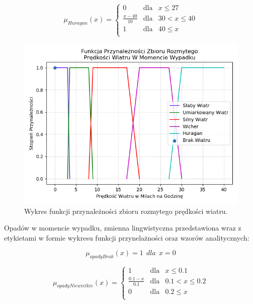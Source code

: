 \documentclass{classrep}
\begin{document}
\begin{equation}
\mu _{Huragan}(x) =  \left\{ \begin{array}{rcl}
 0 & \mbox{dla} & x \leq 27 \\
\frac{x - 40}{10} & \mbox{dla} & 30 < x \leq 40\\
1 & \mbox{dla} & 40 \leq x\\
\end{array}\right.
\end{equation}
\newpage
\begin{figure}[h!]
 \centering
 \includegraphics[width=14cm]{FunkcjaPrzynaleznosciPredkoscWiatru.png}
 \vspace{-0.3cm}
 \caption{Wykres funkcji przynależności zbioru rozmytego prędkości wiatru. }
 \label{rysunek do eksperymentu 1 wariantu 1}
\end{figure}
\newpage



Opadów w momencie wypadku, zmienna lingwistyczna przedstawiona wraz z etykietami w formie wykresu funkcji przynelażności oraz wzorów analitycznych:

\begin{equation}
\mu _{opadyBrak}(x) =   1 \ \ dla \ \ x  = 0
\end{equation}

\begin{equation}
\mu _{opadyNiewielkie}(x) =  \left\{ \begin{array}{rcl}
 1 & \mbox{dla} & x  \leq 0.1 \\
\frac{0.1- x}{0.1} & \mbox{dla} & 0.1 < x \leq 0.2\\
0 & \mbox{dla} & 0.2 \leq x\\
\end{array}\right.
\end{equation}
\end{document}
